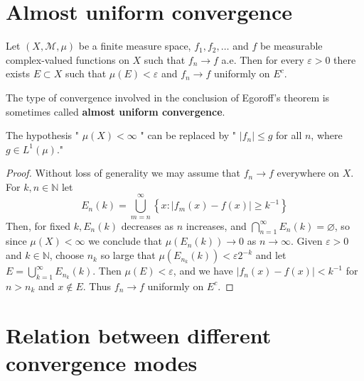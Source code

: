 \documentclass[12pt, a4paper, oneside]{book}
\begin{document}
\section{Almost uniform convergence}
\begin{theorem}
    Let $\left(X,\mathcal{M},\mu\right)$ be a finite measure space, $f_1, f_2, \ldots$ and $f$ be measurable complex-valued functions on $X$ such that $f_n \rightarrow f$ a.e. Then for every $\varepsilon>0$ there exists $E \subset X$ such that $\mu(E)<\varepsilon$ and $f_n \rightarrow f$ uniformly on $E^c$.
    \begin{remark}
        The type of convergence involved in the conclusion of Egoroff's theorem is sometimes called \textbf{almost uniform convergence}.

        The hypothesis " $\mu(X)<\infty$ " can be replaced by " $\left|f_n\right| \leq g$ for all $n$, where $g \in L^1(\mu)$."
    \end{remark}
    \begin{proof}
        Without loss of generality we may assume that $f_n \rightarrow f$ everywhere on $X$. For $k, n \in \mathbb{N}$ let
        \begin{equation*}
            E_n(k)=\bigcup_{m=n}^{\infty}\left\{x:\left|f_m(x)-f(x)\right| \geq k^{-1}\right\}
        \end{equation*}
        Then, for fixed $k, E_n(k)$ decreases as $n$ increases, and $\bigcap_{n=1}^{\infty} E_n(k)=\varnothing$, so since $\mu(X)<\infty$ we conclude that $\mu\left(E_n(k)\right) \rightarrow 0$ as $n \rightarrow \infty$. Given $\varepsilon>0$ and $k \in \mathbb{N}$, choose $n_k$ so large that $\mu\left(E_{n_k}(k)\right)<\varepsilon 2^{-k}$ and let $E=\bigcup_{k=1}^{\infty} E_{n_k}(k)$. Then $\mu(E)<\varepsilon$, and we have $\left|f_n(x)-f(x)\right|<k^{-1}$ for $n>n_k$ and $x \notin E$. Thus $f_n \rightarrow f$ uniformly on $E^c$.
    \end{proof}


\end{theorem}



\section{Relation between different convergence modes}
\end{document}

